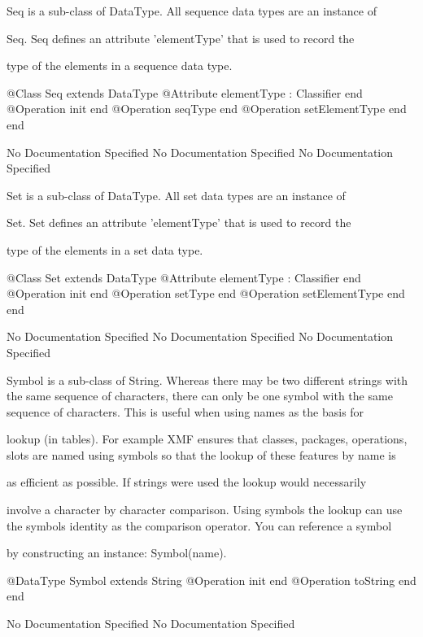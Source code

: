       Seq is a sub-class of DataType. All sequence data types are an instance of

      Seq. Seq defines an attribute 'elementType' that is used to record the

       type of the elements in a sequence data type.
\begin{Interface}
@Class Seq extends DataType
  @Attribute elementType : Classifier end
  @Operation init end
  @Operation seqType end
  @Operation setElementType end
end
\end{Interface}
No Documentation Specified
No Documentation Specified
No Documentation Specified

      Set is a sub-class of DataType. All set data types are an instance of

      Set. Set defines an attribute 'elementType' that is used to record the

      type of the elements in a set data type.
\begin{Interface}
@Class Set extends DataType
  @Attribute elementType : Classifier end
  @Operation init end
  @Operation setType end
  @Operation setElementType end
end
\end{Interface}
No Documentation Specified
No Documentation Specified
No Documentation Specified

      Symbol is a sub-class of String. Whereas there may be two different strings 
      with the same sequence of characters, there can only be one symbol with the 
      same sequence of characters. This is useful when using names as the basis for

      lookup (in tables). For example XMF ensures that classes, packages, operations,
      slots are named using symbols so that the lookup of these features by name is

      as efficient as possible. If strings were used the lookup would necessarily

      involve a character by character comparison. Using symbols the lookup can use 
      the symbols identity as the comparison operator. You can reference a symbol

      by constructing an instance: Symbol(name).
\begin{Interface}
@DataType Symbol extends String
  @Operation init end
  @Operation toString end
end
\end{Interface}
No Documentation Specified
No Documentation Specified

